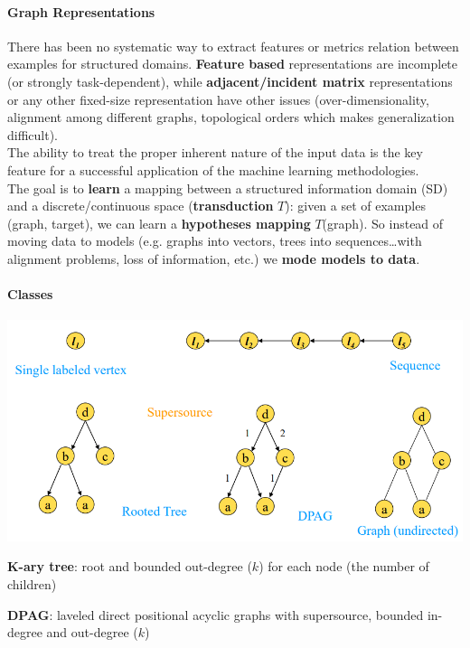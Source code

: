 \documentclass[10pt]{report}
\begin{document}
\paragraph{Graph Representations} There has been no systematic way to extract features or metrics relation between examples for structured domains. \textbf{Feature based} representations are incomplete (or strongly task-dependent), while \textbf{adjacent/incident matrix} representations or any other fixed-size representation have other issues (over-dimensionality, alignment among different graphs, topological orders which makes generalization difficult).\\
The ability to treat the proper inherent nature of the input data is the key feature for a successful application of the machine learning methodologies.\\
The goal is to \textbf{learn} a mapping between a structured information domain (SD) and a discrete/continuous space (\textbf{transduction} $T$): given a set of examples (graph, target), we can learn a \textbf{hypotheses mapping} $T$(graph). So instead of moving data to models (e.g. graphs into vectors, trees into sequences\ldots with alignment problems, loss of information, etc.) we \textbf{mode models to data}.
\paragraph{Classes}
\begin{center}
	\includegraphics[scale=0.5]{40.png}
\end{center}\begin{list}{}{}
	\item \textbf{K-ary tree}: root and bounded out-degree ($k$) for each node (the number of children)
	\item \textbf{DPAG}: laveled direct positional acyclic graphs with supersource, bounded in-degree and out-degree ($k$)
\end{list}
\end{document}
